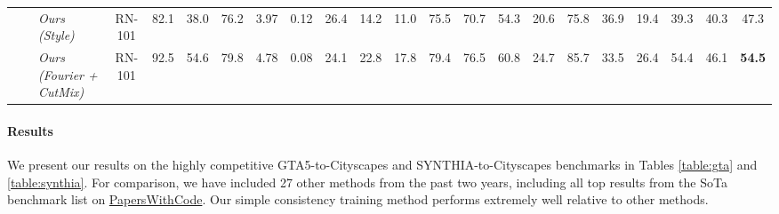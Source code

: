 \documentclass[final]{cvpr}
\begin{document}
\begin{table*}[h]
\begin{center}
\begin{tabular}{lll|c|cccccccccccccccc|c|c}
& & \textit{Ours (Style)}         &  RN-101 &  82.1 &  38.0 &  76.2 &  3.97 &  0.12 &  26.4 &  14.2 &  11.0 &  75.5 &  70.7 &  54.3 &  20.6 &  75.8 &  36.9 &  19.4 &  39.3 &  40.3 &  47.3 \\
\arrayrulecolor{gray!30}
\midrule
\arrayrulecolor{black}
& & \textit{Ours (Fourier + CutMix)}         &  RN-101 &  92.5 & 54.6 & 79.8 & 4.78 & 0.08 & 24.1 & 22.8 & 17.8 & 79.4 & 76.5 & 60.8 & 24.7 & 85.7 & 33.5 & 26.4 & 54.4 & 46.1 & \textbf{54.5} \\
 \bottomrule
\end{tabular}
\vspace{2mm}
\caption{Results on the SYNTHIA-to-Cityscapes benchmark. mIoU-16 and mIoU-13 refer to mean intersection-over-union on the standard sets of 16 and 13 classes, respectively.}
\label{table:synthia}
\end{center}  
\end{table*}



\begin{figure*}[!ht]
  \centering
  \caption{Qualitative examples of our consistency training method and prior methods on GTA5-to-Cityscapes. The column "Ours" refers to our baseline model with augmentation-based perturbations. Note that these images are not hand-picked; they are the first 5 images in the Cityscapes validation set. Visually, our method yields better segmentations than prior techniques. On the third image, for example, it is the only method that properly segments the bicycle (shown in red) and the only method that does not mistake a large proportion of the building for sky. }
  \label{fig:qualitative_gta}
\end{figure*}

\paragraph{Results}

We present our results on the highly competitive GTA5-to-Cityscapes and SYNTHIA-to-Cityscapes benchmarks in Tables \ref{table:gta} and \ref{table:synthia}. For comparison, we have included 27 other methods from the past two years, including all top results from the SoTa benchmark list on \href{https://paperswithcode.com/sota/synthetic-to-real-translation-on-gtav-to}{PapersWithCode}. Our simple consistency training method performs extremely well relative to other methods. 
\end{document}
